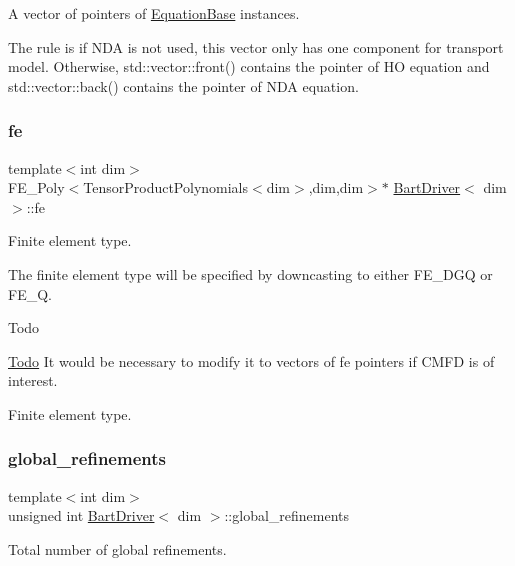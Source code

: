 A vector of pointers of \hyperlink{class_equation_base}{Equation\+Base} instances. 

The rule is if N\+DA is not used, this vector only has one component for transport model. Otherwise, std\+::vector\+::front() contains the pointer of HO equation and std\+::vector\+::back() contains the pointer of N\+DA equation. \mbox{\label{class_bart_driver_ac2e63d4ab8a403649e19f4b1acf94c04}} 
\subsubsection{\texorpdfstring{fe}{fe}}
{\footnotesize\ttfamily template$<$int dim$>$ \\
F\+E\+\_\+\+Poly$<$Tensor\+Product\+Polynomials$<$dim$>$,dim,dim$>$$\ast$ \hyperlink{class_bart_driver}{Bart\+Driver}$<$ dim $>$\+::fe\hspace{0.3cm}{\ttfamily [private]}}



Finite element type. 

The finite element type will be specified by downcasting to either F\+E\+\_\+\+D\+GQ or F\+E\+\_\+Q.

\begin{DoxyRefDesc}{Todo}
\item[\hyperlink{todo__todo000001}{Todo}]It would be necessary to modify it to vectors of fe pointers if C\+M\+FD is of interest. \end{DoxyRefDesc}
Finite element type. \mbox{\label{class_bart_driver_a1ddb881c78ef92c59f2c686b320c970e}} 
\subsubsection{\texorpdfstring{global\+\_\+refinements}{global\_refinements}}
{\footnotesize\ttfamily template$<$int dim$>$ \\
unsigned int \hyperlink{class_bart_driver}{Bart\+Driver}$<$ dim $>$\+::global\+\_\+refinements\hspace{0.3cm}{\ttfamily [private]}}



Total number of global refinements. 

